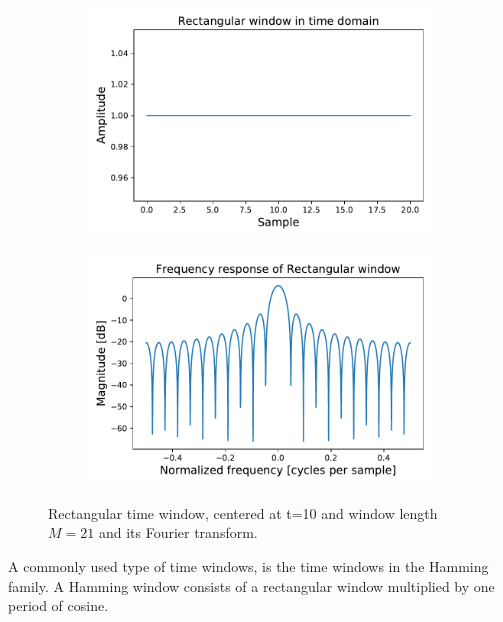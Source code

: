 \begin{figure}[H]
    \centering
    \begin{subfigure}[b]{.49\textwidth}
        \centering
        \includegraphics[width=\textwidth]{figures/RectangularTime.pdf}
         \caption{}
        \label{fig:RectangularTime}
    \end{subfigure}
    \begin{subfigure}[b]{.49\textwidth}
        \centering
        \includegraphics[width=\textwidth]{figures/RectangularFourier.pdf}
        \caption{}
        \label{fig:RectangularFourier}
    \end{subfigure}
\caption{Rectangular time window, centered at t=10 and window length $M=21$ and its Fourier transform.}
\label{fig: Rectangular}
\end{figure}

A commonly used type of time windows, is the time windows in the Hamming family. A Hamming window consists of a rectangular window multiplied by one period of cosine. 

